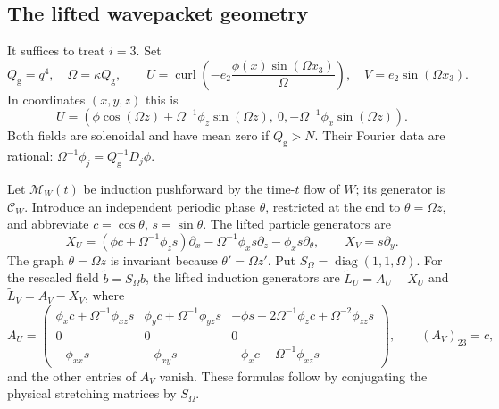 \documentclass[11pt,a4paper]{amsart}
\theoremstyle{definition}
\theoremstyle{remark}
\numberwithin{equation}{section}
\newcommand{\Ccal}{\mathcal C}
\newcommand{\Mcal}{\mathcal M}
\newcommand{\curl}{\operatorname{curl}}
\DeclareMathOperator{\diag}{diag}
\begin{document}
\subsection{The lifted wavepacket geometry}

It suffices to treat $i=3$.  Set
\begin{equation}\label{eq:wavepacket-fields}
 Q_{\mathrm g}=q^4,\quad \Omega=\kappa Q_{\mathrm g},\qquad
 U=\curl\!\left(-e_2\frac{\phi(x)\sin(\Omega x_3)}\Omega\right),
 \quad V=e_2\sin(\Omega x_3).
\end{equation}
In coordinates $(x,y,z)$ this is
\[
 U=(\phi\cos(\Omega z)+\Omega^{-1}\phi_z\sin(\Omega z),\ 0,
                         -\Omega^{-1}\phi_x\sin(\Omega z)).
\]
Both fields are solenoidal and have mean zero if $Q_{\mathrm g}>N$.  Their Fourier data
are rational: $\Omega^{-1}\phi_j=Q_{\mathrm g}^{-1}D_j\phi$.

Let $\Mcal_W(t)$ be induction pushforward by the time-$t$ flow of $W$;
its generator is $\Ccal_W$.  Introduce an independent periodic phase
$\theta$, restricted at the end to $\theta=\Omega z$, and abbreviate
$c=\cos\theta$, $s=\sin\theta$.  The lifted particle generators are
\begin{equation}\label{eq:lifted-particles}
 X_U=(\phi c+\Omega^{-1}\phi_zs)\partial_x
       -\Omega^{-1}\phi_xs\partial_z-\phi_xs\partial_\theta,
 \qquad X_V=s\partial_y.
\end{equation}
The graph $\theta=\Omega z$ is invariant because $\theta'=\Omega z'$.  Put
$S_\Omega =\diag(1,1,\Omega)$.  For the rescaled field $\widetilde b=S_\Omega b$, the lifted
induction generators are $\widetilde L_U=A_U-X_U$ and
$\widetilde L_V=A_V-X_V$, where
\begin{equation}\label{eq:lifted-matrices}
 A_U=\begin{pmatrix}
 \phi_xc+\Omega^{-1}\phi_{xz}s&\phi_yc+\Omega^{-1}\phi_{yz}s&
       -\phi s+2\Omega ^{-1}\phi_zc+\Omega^{-2}\phi_{zz}s\\
 0&0&0\\
 -\phi_{xx}s&-\phi_{xy}s&-\phi_xc-\Omega^{-1}\phi_{xz}s
 \end{pmatrix},\qquad (A_V)_{23}=c,
\end{equation}
and the other entries of $A_V$ vanish.  These formulas follow by conjugating
the physical stretching matrices by $S_\Omega $.
\end{document}
